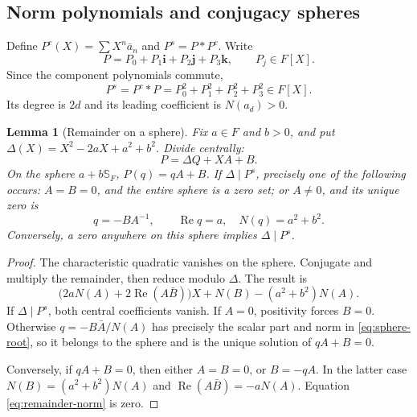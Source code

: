 \documentclass[11pt,letterpaper]{article}
\newtheorem{lemma}[theorem]{Lemma}
\theoremstyle{definition}
\newcommand{\ii}{\mathbf i}
\newcommand{\jj}{\mathbf j}
\newcommand{\kk}{\mathbf k}
\newcommand{\Ss}{\mathbb S_F}
\DeclareMathOperator{\Rea}{Re}
\begin{document}
\subsection{Norm polynomials and conjugacy spheres}
Define $P^c(X)=\sum X^n\bar a_n$ and $P^s=P*P^c$. Write
\[
 P=P_0+P_1\ii+P_2\jj+P_3\kk,\qquad P_j\in F[X].
\]
Since the component polynomials commute,
\begin{equation}
 P^s=P^c*P=P_0^2+P_1^2+P_2^2+P_3^2\in F[X].
 \label{eq:symmetrization}
\end{equation}
Its degree is $2d$ and its leading coefficient is $N(a_d)>0$.

\begin{lemma}[Remainder on a sphere]
\label{lem:sphere-remainder}
Fix $a\in F$ and $b>0$, and put
$\Delta(X)=X^2-2aX+a^2+b^2$. Divide centrally:
\[
 P=\Delta Q+XA+B.
\]
On the sphere $a+b\Ss$, $P(q)=qA+B$. If $\Delta\mid P^s$, precisely one of the
following occurs: $A=B=0$, and the entire sphere is a zero set; or $A\ne0$, and
its unique zero is
\begin{equation}
 q=-BA^{-1},\qquad \Rea q=a,\quad N(q)=a^2+b^2.
 \label{eq:sphere-root}
\end{equation}
Conversely, a zero anywhere on this sphere implies $\Delta\mid P^s$.
\end{lemma}
\begin{proof}
The characteristic quadratic vanishes on the sphere. Conjugate and multiply
the remainder, then reduce modulo $\Delta$. The result is
\begin{equation}
 \bigl(2aN(A)+2\Rea(A\bar B)\bigr)X
       +N(B)-(a^2+b^2)N(A).
 \label{eq:remainder-norm}
\end{equation}
If $\Delta\mid P^s$, both central coefficients vanish. If $A=0$, positivity
forces $B=0$. Otherwise $q=-B\bar A/N(A)$ has precisely the scalar part and norm
in \eqref{eq:sphere-root}, so it belongs to the sphere and is the unique
solution of $qA+B=0$.

Conversely, if $qA+B=0$, then either $A=B=0$, or $B=-qA$. In the latter case
$N(B)=(a^2+b^2)N(A)$ and
$\Rea(A\bar B)=-aN(A)$. Equation \eqref{eq:remainder-norm} is zero.
\end{proof}
\end{document}
